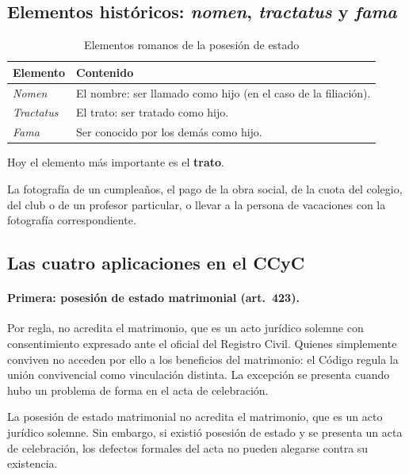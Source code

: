 \documentclass[12pt,oneside]{book}
\begin{document}
\subsection{Elementos históricos: \textit{nomen}, \textit{tractatus} y \textit{fama}}

\begin{table}[H]
\centering
\begin{tabularx}{\textwidth}{B{0.20\textwidth} Y}
\toprule
\textbf{Elemento} & \textbf{Contenido} \\
\midrule
\textit{Nomen} & El nombre: ser llamado como hijo (en el caso de la filiación). \\
\textit{Tractatus} & El trato: ser tratado como hijo. \\
\textit{Fama} & Ser conocido por los demás como hijo. \\
\bottomrule
\end{tabularx}
\caption{Elementos romanos de la posesión de estado}
\end{table}

Hoy el elemento más importante es el \textbf{trato}.

\begin{ejemplo}
La fotografía de un cumpleaños, el pago de la obra social, de la cuota del colegio, del club o de un profesor particular, o llevar a la persona de vacaciones con la fotografía correspondiente.
\end{ejemplo}

\subsection{Las cuatro aplicaciones en el CCyC}

\paragraph{Primera: posesión de estado matrimonial (art.~423).} Por regla, no acredita el matrimonio, que es un acto jurídico solemne con consentimiento expresado ante el oficial del Registro Civil. Quienes simplemente conviven no acceden por ello a los beneficios del matrimonio: el Código regula la unión convivencial como vinculación distinta. La excepción se presenta cuando hubo un problema de forma en el acta de celebración.

\begin{regla}
La posesión de estado matrimonial no acredita el matrimonio, que es un acto jurídico solemne. Sin embargo, si existió posesión de estado y se presenta un acta de celebración, los defectos formales del acta no pueden alegarse contra su existencia.
\end{regla}
\end{document}
